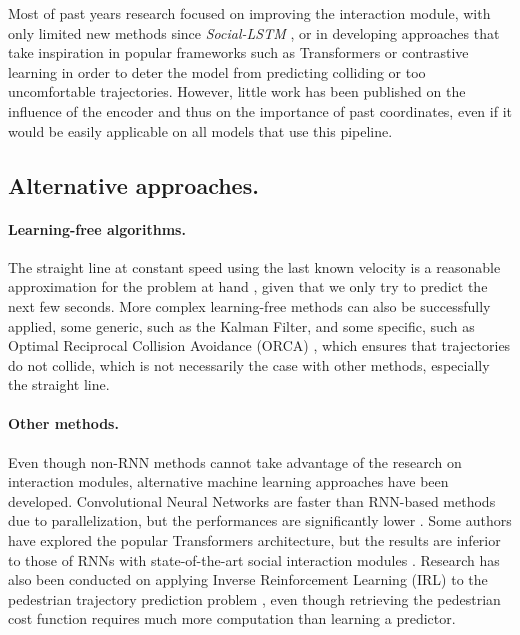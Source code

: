 \documentclass[conference]{IEEEtran}
\begin{document}
Most of past years research focused on improving the interaction module, with only limited new methods since \textit{Social-LSTM} \cite{alahi_social_2016}, or in developing approaches that take inspiration in popular frameworks such as Transformers \cite{giuliari_transformer_2020} or contrastive learning \cite{liu_social_2020} in order to deter the model from predicting colliding or too uncomfortable trajectories. However, little work has been published on the influence of the encoder and thus on the importance of past coordinates, even if it would be easily applicable on all models that use this pipeline.

\subsection{Alternative approaches.}

\paragraph{Learning-free algorithms.} The straight line at constant speed using the last known velocity is a reasonable approximation for the problem at hand \cite{scholler_what_2020}, given that we only try to predict the next few seconds. More complex learning-free methods can also be successfully applied, some generic, such as the Kalman Filter, and some specific, such as Optimal Reciprocal Collision Avoidance (ORCA) \cite{orca}, which ensures that trajectories do not collide, which is not necessarily the case with other methods, especially the straight line.
 
\paragraph{Other methods.} Even though non-RNN methods cannot take advantage of the research on interaction modules, alternative machine learning approaches have been developed. Convolutional Neural Networks are faster than RNN-based methods due to parallelization, but the performances are significantly lower \cite{nikhil_convolutional_2018}. Some authors have explored the popular Transformers architecture, but the results are inferior to those of RNNs with state-of-the-art social interaction modules \cite{giuliari_transformer_2020}. Research has also been conducted on applying Inverse Reinforcement Learning (IRL) to the pedestrian trajectory prediction problem \cite{fernando_neighbourhood_2019}, even though retrieving the pedestrian cost function requires much more computation than learning a predictor.
\end{document}

